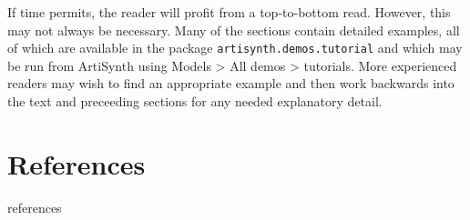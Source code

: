 \documentclass{article}
\begin{document}
If time permits, the reader will profit from a top-to-bottom read.
However, this may not always be necessary. Many of the sections
contain detailed examples, all of which are available in
the package {\tt artisynth.demos.tutorial} and which may be run from
ArtiSynth using {\sf Models > All demos > tutorials}. 
More experienced readers may wish to find an appropriate example and
then work backwards into the text and preceeding sections for any
needed explanatory detail.

















\iflatexml


\else
\section*{References}

\begin{btSect}{references}
\btPrintCited
\end{btSect}
\fi
\end{document}

